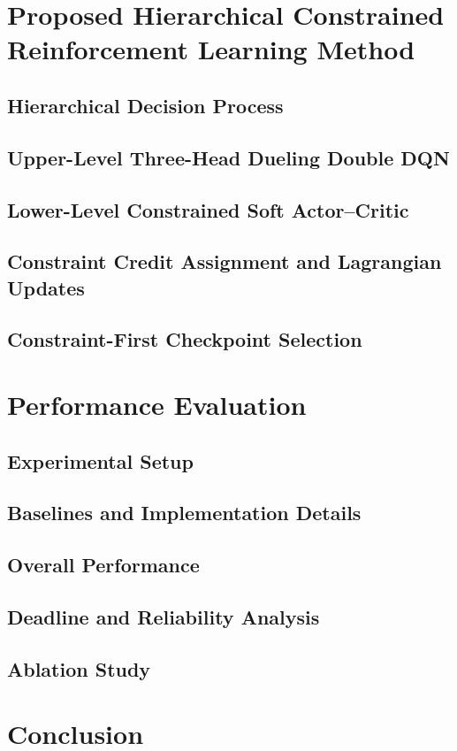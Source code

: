 \documentclass[lettersize,journal]{IEEEtran}
\begin{document}
\section{Proposed Hierarchical Constrained Reinforcement Learning Method}
\label{sec:method}

\subsection{Hierarchical Decision Process}

\subsection{Upper-Level Three-Head Dueling Double DQN}

\subsection{Lower-Level Constrained Soft Actor--Critic}

\subsection{Constraint Credit Assignment and Lagrangian Updates}

\subsection{Constraint-First Checkpoint Selection}

\section{Performance Evaluation}
\label{sec:evaluation}

\subsection{Experimental Setup}

\subsection{Baselines and Implementation Details}

\subsection{Overall Performance}

\subsection{Deadline and Reliability Analysis}

\subsection{Ablation Study}

\section{Conclusion}
\label{sec:conclusion}



\end{document}

